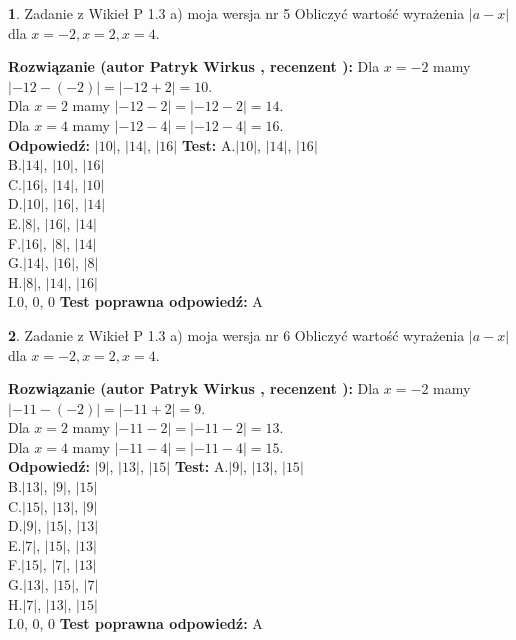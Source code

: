 \documentclass[12pt, a4paper]{article}
\theoremstyle{definition} %
\newtheorem{zad}{}
\newcommand{\zadStart}[1]{\begin{zad}#1\newline}
\newcommand{\zadStop}{\end{zad}}
\newcommand{\rozwStart}[2]{\noindent \textbf{Rozwiązanie (autor #1 , recenzent #2): }\newline}
\newcommand{\rozwStop}{\newline}
\newcommand{\odpStart}{\noindent \textbf{Odpowiedź:}\newline}
\newcommand{\odpStop}{\newline}
\newcommand{\testStart}{\noindent \textbf{Test:}\newline}
\newcommand{\testStop}{\newline}
\newcommand{\kluczStart}{\noindent \textbf{Test poprawna odpowiedź:}\newline}
\newcommand{\kluczStop}{\newline}
\begin{document}
\zadStart{Zadanie z Wikieł P 1.3 a) moja wersja nr 5}
Obliczyć wartość wyrażenia $|a - x|$ dla $x=-2,x=2,x=4$.
\zadStop
\rozwStart{Patryk Wirkus}{}
Dla $x = -2$ mamy $|-12 - (-2)| = |-12 + 2| = 10$.\\
Dla $x = 2$ mamy $|-12 - 2| = |-12 - 2| = 14$.\\
Dla $x = 4$ mamy $|-12 - 4| = |-12 - 4| = 16$.\\
\rozwStop
\odpStart
$|10|$, $|14|$, $|16|$
\odpStop
\testStart
A.$|10|$, $|14|$, $|16|$\\
B.$|14|$, $|10|$, $|16|$\\
C.$|16|$, $|14|$, $|10|$\\
D.$|10|$, $|16|$, $|14|$\\
E.$|8|$, $|16|$, $|14|$\\
F.$|16|$, $|8|$, $|14|$\\
G.$|14|$, $|16|$, $|8|$\\
H.$|8|$, $|14|$, $|16|$\\
I.$0$, $0$, $0$
\testStop
\kluczStart
A
\kluczStop



\zadStart{Zadanie z Wikieł P 1.3 a) moja wersja nr 6}
Obliczyć wartość wyrażenia $|a - x|$ dla $x=-2,x=2,x=4$.
\zadStop
\rozwStart{Patryk Wirkus}{}
Dla $x = -2$ mamy $|-11 - (-2)| = |-11 + 2| = 9$.\\
Dla $x = 2$ mamy $|-11 - 2| = |-11 - 2| = 13$.\\
Dla $x = 4$ mamy $|-11 - 4| = |-11 - 4| = 15$.\\
\rozwStop
\odpStart
$|9|$, $|13|$, $|15|$
\odpStop
\testStart
A.$|9|$, $|13|$, $|15|$\\
B.$|13|$, $|9|$, $|15|$\\
C.$|15|$, $|13|$, $|9|$\\
D.$|9|$, $|15|$, $|13|$\\
E.$|7|$, $|15|$, $|13|$\\
F.$|15|$, $|7|$, $|13|$\\
G.$|13|$, $|15|$, $|7|$\\
H.$|7|$, $|13|$, $|15|$\\
I.$0$, $0$, $0$
\testStop
\kluczStart
A
\kluczStop
\end{document}
